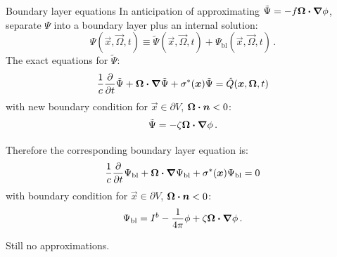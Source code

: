 \documentclass{beamer}
\begin{document}
\begin{frame}{Boundary layer equations}
In anticipation of approximating $\tilde \Psi = - f \bm{\Omega}\bm{\cdot} \bm{\nabla} \phi$,
separate $\Psi$ into a boundary layer plus an internal solution:
\begin{equation*}
  \Psi(\vec{x}, \vec{\Omega}, t)
  \equiv \tilde \Psi(\vec{x}, \vec{\Omega}, t)
  + \Psi_\mathrm{bl}(\vec{x}, \vec{\Omega}, t)\,.
\end{equation*}
The exact equations for $\tilde \Psi$:
\begin{equation*}
  \frac{1}{c} \frac{\partial }{\partial t} \tilde\Psi
   + \bm{\Omega}\bm{\cdot} \bm{\nabla} \tilde\Psi
   + \sigma^\ast(\bm{x}) \tilde\Psi
  =  \hat Q(\bm{x}, \bm{\Omega}, t)
\end{equation*}
with new boundary condition for $\vec{x} \in \partial V$, $\bm{\Omega}\bm{\cdot}
\bm{n} < 0$:
\begin{equation*}
  \tilde\Psi = -\zeta \bm{\Omega}\bm{\cdot} \bm{\nabla} \phi\,.
\end{equation*}

Therefore the corresponding boundary layer equation is:
\begin{equation*}
  \frac{1}{c} \frac{\partial }{\partial t} \Psi_\mathrm{bl}
   + \bm{\Omega}\bm{\cdot} \bm{\nabla} \Psi_\mathrm{bl}
   + \sigma^\ast(\bm{x}) \Psi_\mathrm{bl}
  = 0
\end{equation*}
with boundary condition for $\vec{x} \in \partial V$, $\bm{\Omega}\bm{\cdot}
\bm{n} < 0$:
\begin{equation*}
  \Psi_\mathrm{bl} = I^b - \frac{1}{4\pi} \phi + \zeta \bm{\Omega}\bm{\cdot} \bm{\nabla}
  \phi \,.
\end{equation*}

{\small Still no approximations.}
\end{frame}
\end{document}
